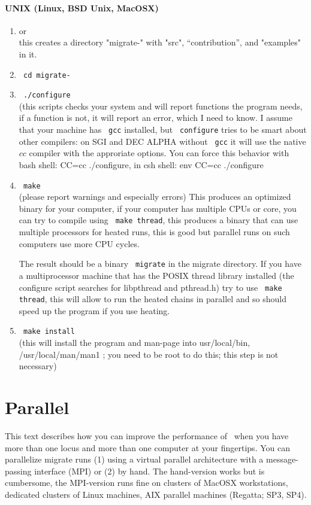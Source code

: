\subsubsection{UNIX (Linux, BSD Unix, MacOSX)}
\begin{enumerate}
\item { or\\
}
   this creates a directory "migrate-\VERSION " with "src", ``contribution'',  and "examples" in it.
\item \texttt{ cd migrate-\VERSION }
\item \texttt{ ./configure} \\(this scripts checks your system and will report 
functions the program needs, if a function is not, it will report an error,
which I need to know. I assume that your machine has \texttt{ gcc} installed,
but \texttt{ configure} tries to be smart about other compilers: 
on SGI and DEC ALPHA without \texttt{ gcc} it will use the native 
$cc$ compiler with the approriate options. You can force this behavior
with bash shell: CC=cc ./configure, in csh shell: env CC=cc ./configure

\item  \texttt{ make}  \\
 (please report warnings and especially errors)
 This produces an optimized binary for your computer, if your computer has multiple CPUs or core, you can try to compile
 using \texttt{ make thread}, this produces a binary that can use multiple processors for heated runs, this is good but parallel
 runs on such computers use more CPU cycles.
 
 The result should be a binary \texttt{ migrate} in the migrate directory.
If you have a multiprocessor machine that has the POSIX thread library
installed (the configure script searches for libpthread and pthread.h)
try to use \texttt{ make thread}, this will allow to run the heated chains
in parallel and so should speed up the program if you use heating.
\item \texttt{ make install} \\ (this will install the program and man-page into usr/local/bin, /usr/local/man/man1
   ; you need to be root to do this; this step is not necessary)
\end{enumerate}


\chapter{Parallel \migrate}
This text describes how you can improve the performance of \migrate\ 
when you have more than one locus and more than one computer at 
your fingertips. You can parallelize migrate runs 
(1) using a virtual parallel architecture with a message-passing 
interface (MPI) or (2) by hand.
The hand-version works but is cumbersome, 
the MPI-version runs fine on clusters of MacOSX workstations, dedicated clusters of Linux machines, 
AIX parallel machines (Regatta; SP3, SP4).

